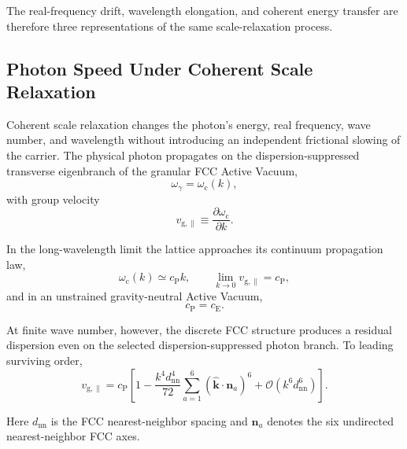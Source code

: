 The real-frequency drift, wavelength elongation, and coherent energy transfer are therefore three representations of the same scale-relaxation process.


\subsection{Photon Speed Under Coherent Scale Relaxation}

Coherent scale relaxation changes the photon's energy, real frequency, wave number, and wavelength without introducing an independent frictional slowing of the carrier. The physical photon propagates on the dispersion-suppressed transverse eigenbranch of the granular FCC Active Vacuum,
\begin{equation}
    \omega_\gamma
    =
    \omega_{\mathrm c}(k),
\end{equation}
with group velocity
\begin{equation}
    v_{\mathrm g,\parallel}
    \equiv
    \frac{\partial\omega_{\mathrm c}}{\partial k}.
\end{equation}

In the long-wavelength limit the lattice approaches its continuum propagation law,
\begin{equation}
    \omega_{\mathrm c}(k)
    \simeq
    c_{\mathrm P}k,
    \qquad
    \lim_{k\rightarrow0}
    v_{\mathrm g,\parallel}
    =
    c_{\mathrm P},
\end{equation}
and in an unstrained gravity-neutral Active Vacuum,
\begin{equation}
    c_{\mathrm P}
    =
    c_{\mathrm E}.
\end{equation}

At finite wave number, however, the discrete FCC structure produces a residual dispersion even on the selected dispersion-suppressed photon branch. To leading surviving order,
\begin{equation}
    v_{\mathrm g,\parallel}
    =
    c_{\mathrm P}
    \left[
        1
        -
        \frac{k^4d_{\mathrm{nn}}^4}{72}
        \sum_{a=1}^{6}
        \left(
            \hat{\mathbf{k}}
            \cdot
            \mathbf n_a
        \right)^6
        +
        \mathcal O\!\left(
            k^6d_{\mathrm{nn}}^6
        \right)
    \right].
\end{equation}

Here $d_{\mathrm{nn}}$ is the FCC nearest-neighbor spacing and $\mathbf n_a$ denotes the six undirected nearest-neighbor FCC axes.

